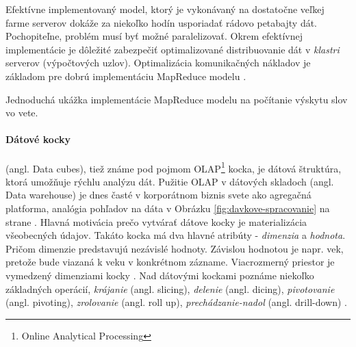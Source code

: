 \label{fig:principy-davkove-mapreduce}

\newpage
Efektívne implementovaný model, ktorý je vykonávaný na dostatočne veľkej farme serverov dokáže za niekoľko hodín usporiadať rádovo petabajty dát. Pochopiteľne, problém musí byť možné paralelizovať. Okrem efektívnej implementácie je dôležité zabezpečiť optimalizované distribuovanie dát v \textit{klastri} serverov (výpočtových uzlov). Optimalizácia komunikačných nákladov je základom pre dobrú implementáciu MapReduce modelu \citep{Dean2008}. 
\\[5pt]
\begin{algorithm}[H]
	\label{alg:mapreduce}
  \caption{Jednoduchá ukážka implementácie MapReduce modelu na počítanie výskytu slov vo vete.}
\end{algorithm}



\paragraph{Dátové kocky} (angl. Data cubes), tiež známe pod pojmom OLAP\footnote{Online Analytical Processing} kocka, je dátová štruktúra, ktorá umožňuje rýchlu analýzu dát. Pužitie OLAP v dátových skladoch (angl. Data warehouse) je dnes časté v korporátnom biznis svete ako agregačná platforma, analógia pohľadov na dáta v Obrázku \ref{fig:davkove-spracovanie} na strane \pageref{fig:davkove-spracovanie}.
Hlavná motivácia prečo vytvárať dátove kocky je materializácia všeobecných údajov. Takáto kocka má dva hlavné atribúty - \textit{dimenzia} a \textit{hodnota}. Pričom dimenzie predstavujú nezávislé hodnoty. Závislou hodnotou je napr. vek, pretože bude viazaná k veku v konkrétnom zázname. Viacrozmerný priestor je vymedzený dimenziami kocky \citep{chaudhuri1997overview}. Nad dátovými kockami poznáme niekoľko základných operácií, \textit{krájanie} (angl. slicing), \textit{delenie} (angl. dicing), \textit{pivotovanie} (angl. pivoting), \textit{zrolovanie} (angl. roll up), \textit{prechádzanie-nadol} (angl. drill-down) \citep{franekimporty}. 

